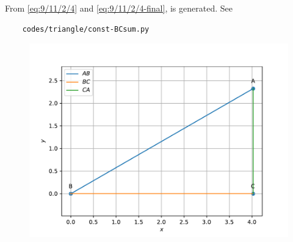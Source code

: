 From 
		\eqref{eq:9/11/2/4}
		and
		\eqref{eq:9/11/2/4-final},
		is generated.
		See
\begin{lstlisting}
	codes/triangle/const-BCsum.py
\end{lstlisting}
	\begin{figure}[!h]
		\centering
 \includegraphics[width=\columnwidth]{chapters/9/11/2/4/figs/vector.pdf}
		\caption{}
		\label{fig:9/11/2/4}
  	\end{figure}

